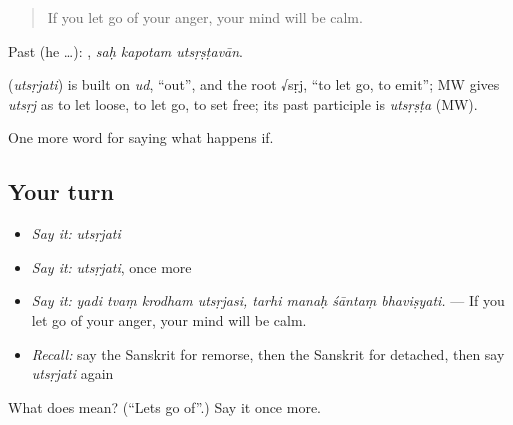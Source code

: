 \begin{quote}
If you let go of your anger, your mind will be calm.
\end{quote}

Past (he …):   , \emph{saḥ kapotam utsṛṣṭavān}.

\begin{cousinweb}
\textbf{} (\emph{utsṛjati}) is built on \emph{ud}, \textquotedblleft{}out\textquotedblright{}, and the root √sṛj, \textquotedblleft{}to let go, to emit\textquotedblright{}; MW gives \emph{utsṛj} as to let loose, to let go, to set free; its past participle is \emph{utsṛṣṭa} (MW).
\end{cousinweb}

\begin{grammarlens}[title={What you've built}]
One more word for saying what happens if.
\end{grammarlens}

\subsection*{Your turn}
\begin{itemize}
\raggedright
  \item \emph{Say it:} \emph{utsṛjati}
  \item \emph{Say it:} \emph{utsṛjati}, once more
  \item \emph{Say it:} \emph{yadi tvaṃ krodham utsṛjasi, tarhi manaḥ śāntaṃ bhaviṣyati.} — If you let go of your anger, your mind will be calm.
  \item \emph{Recall:} say the Sanskrit for remorse, then the Sanskrit for detached, then say \emph{utsṛjati} again
\end{itemize}

\begin{tcolorbox}[breakable,colback=teal!4,colframe=teal!35!black,title={Before you move on}]
What does  mean? (\textquotedblleft{}Lets go of\textquotedblright{}.) Say it once more.
\end{tcolorbox}
